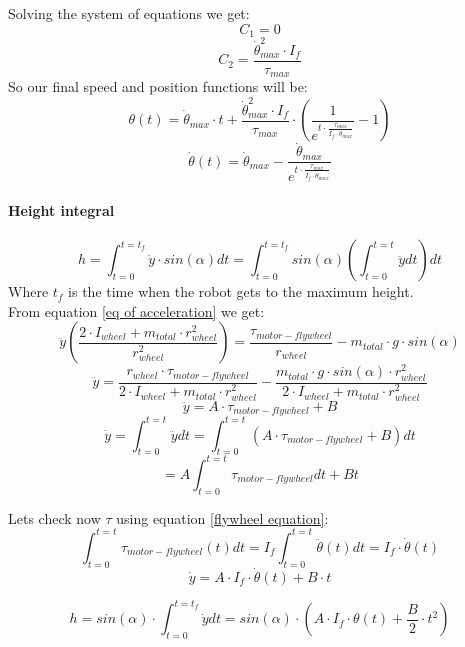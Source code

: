     Solving the system of equations we get:
    \begin{equation*}
        C_1
        =0
    \end{equation*}
    \begin{equation*}
        C_2
        =
        \frac{\dot{\theta}^2_{max}\cdot I_f}{\tau_{max}}
    \end{equation*}
    So our final speed and position functions will be:
    \begin{equation}
        \label{eq: theta(t)}
        \theta(t) =  
        \dot{\theta}_{max} \cdot t+
        \frac{\dot{\theta}^2_{max}\cdot I_f}{\tau_{max}} \cdot (\frac{1}
        {e^{t\cdot \frac{\tau_{max}}{I_f \cdot \dot{\theta}_{max}}}}-1)
    \end{equation}
    \begin{equation}
        \label{eq: dottheta(t)}
        \dot{\theta}(t) = \dot{\theta}_{max}
        - \frac{\dot{\theta}_{max}}
        {e^{t\cdot \frac{\tau_{max}}{I_f \cdot \dot{\theta}_{max}}}}
    \end{equation}
    \paragraph{Height integral}
    \[h=\int_{t=0}^{t=t_f} \dot{y}\cdot sin(\alpha) dt =\int_{t=0}^{t=t_f} sin(\alpha) (\int_{t=0}^{t=t} \ddot{y} dt)dt \]
    Where $t_f$ is the time when the robot gets to the maximum height.\\    
    From equation \ref{eq of acceleration} we get:
    \[\ddot{y}(\frac{2\cdot I_{wheel}+ m_{total} \cdot r^2_{wheel} }{r^2_{wheel}}) =  \frac{\tau_{motor-flywheel}}{r_{wheel}} - m_{total} \cdot g \cdot sin(\alpha)\]
    \[\ddot{y}=
    \frac{r_{wheel}\cdot\tau_{motor-flywheel}}{2\cdot I_{wheel}+ m_{total} \cdot r^2_{wheel}}
    - \frac{m_{total} \cdot g \cdot sin(\alpha)\cdot r^2_{wheel}}{2\cdot I_{wheel}+ m_{total} \cdot r^2_{wheel}}\]    \[\ddot{y}=A\cdot \tau_{motor-flywheel} + B\]
    \[\dot{y} =\int_{t=0}^{t=t} \ddot{y} dt = \int_{t=0}^{t=t} (A\cdot \tau_{motor-flywheel} + B) dt\]
    \[=A\int_{t=0}^{t=t} \tau_{motor-flywheel} dt + B t \]
  
Lets check now $\tau$ using equation \ref{flywheel equation}:
    \[\int_{t=0}^{t=t} \tau_{motor-flywheel}(t) dt = 
    I_f\int_{t=0}^{t=t}\ddot{\theta}(t) dt= 
    I_f\cdot \dot{\theta}(t)\]
    \[\dot{y} =A\cdot I_f\cdot \dot{\theta}(t)+B\cdot t\]

    \[h=sin(\alpha)\cdot \int_{t=0}^{t=t_f} \dot{y} dt =sin(\alpha)\cdot (A\cdot I_f\cdot \theta(t)+\frac{B}{2}\cdot t^2)\]
    